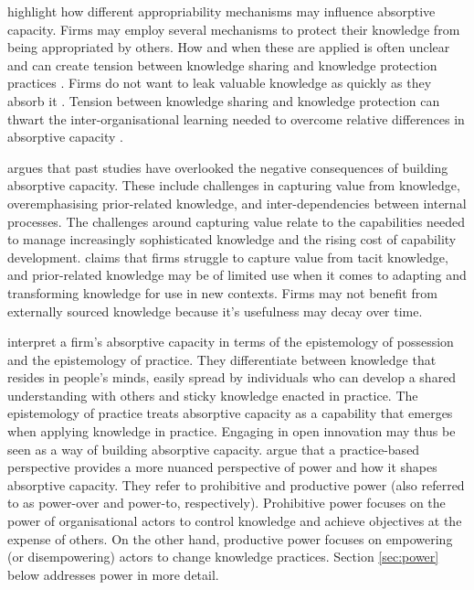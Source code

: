 \citet{todorova2007absorptive} highlight how different appropriability mechanisms may influence absorptive capacity. Firms may employ several mechanisms to protect their knowledge from being appropriated by others. How and when these are applied is often unclear and can create tension between knowledge sharing and knowledge protection practices \citep{gama2019managing}. Firms do not want to leak valuable knowledge as quickly as they absorb it \citep{todorova2007absorptive}. Tension between knowledge sharing and knowledge protection can thwart the inter-organisational learning needed to overcome relative differences in absorptive capacity \citep{dragsdahl2019perspective,gama2019managing}. \medskip

\citet {lichtenthaler2016absorptive} argues that past studies have overlooked the negative consequences of building absorptive capacity. These include challenges in capturing value from knowledge, overemphasising prior-related knowledge, and inter-dependencies between internal processes. The challenges around capturing value relate to the capabilities needed to manage increasingly sophisticated knowledge and the rising cost of capability development. \citet{lichtenthaler2016absorptive} claims that firms struggle to capture value from tacit knowledge, and prior-related knowledge may be of limited use when it comes to adapting and transforming knowledge for use in new contexts. Firms may not benefit from externally sourced knowledge because it's usefulness may decay over time. \medskip

\citet{marabelli2014knowing} interpret a firm's absorptive capacity in terms of the epistemology of possession and the epistemology of practice. They differentiate between knowledge that resides in people's minds, easily spread by individuals who can develop a shared understanding with others and sticky knowledge enacted in practice. The epistemology of practice treats absorptive capacity as a capability that emerges when applying knowledge in practice. Engaging in open innovation may thus be seen as a way of building absorptive capacity. \citet{marabelli2014knowing} argue that a practice-based perspective provides a more nuanced perspective of power and how it shapes absorptive capacity. They refer to prohibitive and productive power (also referred to as power-over and power-to, respectively). Prohibitive power focuses on the power of organisational actors to control knowledge and achieve objectives at the expense of others. On the other hand, productive power focuses on empowering (or disempowering) actors to change knowledge practices. Section \ref{sec:power} below addresses power in more detail. \medskip


